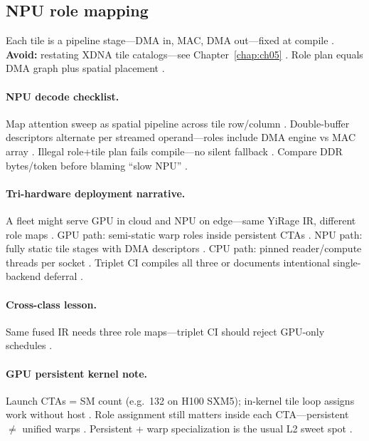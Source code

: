 \subsection{NPU role mapping}

Each tile is a pipeline stage---DMA in, MAC, DMA out---fixed at compile \citep{amd2024xdna,amd2024aie}.
\textbf{Avoid:} restating XDNA tile catalogs---see Chapter~\ref{chap:ch05} \citep{amd2024xdna,yirage2026}.
Role plan equals DMA graph plus spatial placement \citep{patel2025llminference,chen2020compilerbasedhardw}.

\paragraph{NPU decode checklist.}
Map attention sweep as spatial pipeline across tile row/column \citep{amd2024aie,dao2022flashattention}.
Double-buffer descriptors alternate per streamed operand---roles include DMA engine vs MAC array \citep{amd2024xdna,patel2025llminference}.
Illegal role+tile plan fails compile---no silent fallback \citep{yirage2026,memoryfloor2026,taxbreak2026}.
Compare DDR bytes/token before blaming ``slow NPU'' \citep{memoryfloor2026,amd2024aie}.

\paragraph{Tri-hardware deployment narrative.}
A fleet might serve GPU in cloud and NPU on edge---same YiRage IR, different role maps \citep{yirage2026,patel2025llminference,amd2024xdna,nvidia2022hopper}.
GPU path: semi-static warp roles inside persistent CTAs \citep{shah2024flashattention3,mpk2025}.
NPU path: fully static tile stages with DMA descriptors \citep{amd2024aie,amd2024xdna,chen2020compilerbasedhardw}.
CPU path: pinned reader/compute threads per socket \citep{dlbook,kwon2023vllm,memoryfloor2026}.
Triplet CI compiles all three or documents intentional single-backend deferral \citep{yirage2026,taxbreak2026}.

\paragraph{Cross-class lesson.}
Same fused IR needs three role maps---triplet CI should reject GPU-only schedules \citep{yirage2026,amd2024aie,nvidia2022hopper,taxbreak2026}.

\paragraph{GPU persistent kernel note.}
Launch CTAs = SM count (e.g.\ 132 on H100 SXM5); in-kernel tile loop assigns work without host \citep{shah2024flashattention3,mpk2025}.
Role assignment still matters inside each CTA---persistent $\neq$ unified warps \citep{patel2025llminference,yirage2026}.
Persistent + warp specialization is the usual L2 sweet spot \citep{nvidia2024cudagraphs,shah2024flashattention3}.

